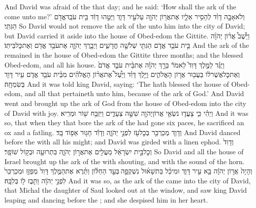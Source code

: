 {And David was afraid of the \lord\space that day; and he said: ‘How shall the ark of the \lord\space come unto me?’}
{וְלֹא\maqqaf אָבָ֣ה דָוִ֗ד לְהָסִ֥יר אֵלָ֛יו אֶת\maqqaf אֲר֥וֹן יְהֹוָ֖ה עַל\maqqaf עִ֣יר דָּוִ֑ד וַיַּטֵּ֣הוּ דָוִ֔ד בֵּ֥ית עֹבֵֽד\maqqaf אֱדֹ֖ם הַגִּתִּֽי׃}
{So David would not remove the ark of the \lord\space unto him into the city of David; but David carried it aside into the house of Obed-edom the Gittite.}
{וַיֵּ֩שֶׁב֩ אֲר֨וֹן יְהֹוָ֜ה בֵּ֣ית עֹבֵ֥ד אֱדֹ֛ם הַגִּתִּ֖י שְׁלֹשָׁ֣ה חֳדָשִׁ֑ים וַיְבָ֧רֶךְ יְהֹוָ֛ה אֶת\maqqaf עֹבֵ֥ד אֱדֹ֖ם וְאֶת\maqqaf כׇּל\maqqaf בֵּיתֽוֹ׃}
{And the ark of the \lord\space remained in the house of Obed-edom the Gittite three months; and the \lord\space blessed Obed-edom, and all his house.}
{וַיֻּגַּ֗ד לַמֶּ֣לֶךְ דָּוִד֮ לֵאמֹר֒ בֵּרַ֣ךְ יְהֹוָ֗ה אֶת\maqqaf בֵּ֨ית עֹבֵ֤ד אֱדֹם֙ וְאֶת\maqqaf כׇּל\maqqaf אֲשֶׁר\maqqaf ל֔וֹ בַּעֲב֖וּר אֲר֣וֹן הָאֱלֹהִ֑ים וַיֵּ֣לֶךְ דָּוִ֗ד וַיַּ֩עַל֩ אֶת\maqqaf אֲר֨וֹן הָאֱלֹהִ֜ים מִבֵּ֨ית עֹבֵ֥ד אֱדֹ֛ם עִ֥יר דָּוִ֖ד בְּשִׂמְחָֽה׃}
{And it was told king David, saying: ‘The \lord\space hath blessed the house of Obed-edom, and all that pertaineth unto him, because of the ark of God.’ And David went and brought up the ark of God from the house of Obed-edom into the city of David with joy.}
{וַיְהִ֗י כִּ֧י צָעֲד֛וּ נֹשְׂאֵ֥י אֲרוֹן\maqqaf יְהֹוָ֖ה שִׁשָּׁ֣ה צְעָדִ֑ים וַיִּזְבַּ֥ח שׁ֖וֹר וּמְרִֽיא׃}
{And it was so, that when they that bore the ark of the \lord\space had gone six paces, he sacrificed an ox and a fatling.}
{וְדָוִ֛ד מְכַרְכֵּ֥ר בְּכׇל\maqqaf עֹ֖ז לִפְנֵ֣י יְהֹוָ֑ה וְדָוִ֕ד חָג֖וּר אֵפ֥וֹד בָּֽד׃}
{And David danced before the \lord\space with all his might; and David was girded with a linen ephod.}
{וְדָוִד֙ וְכׇל\maqqaf בֵּ֣ית יִשְׂרָאֵ֔ל מַעֲלִ֖ים אֶת\maqqaf אֲר֣וֹן יְהֹוָ֑ה בִּתְרוּעָ֖ה וּבְק֥וֹל שׁוֹפָֽר׃}
{So David and all the house of Israel brought up the ark of the \lord\space with shouting, and with the sound of the horn.}
{וְהָיָה֙ אֲר֣וֹן יְהֹוָ֔ה בָּ֖א עִ֣יר דָּוִ֑ד וּמִיכַ֨ל בַּת\maqqaf שָׁא֜וּל נִשְׁקְפָ֣ה \legarmeh  בְּעַ֣ד הַחַלּ֗וֹן וַתֵּ֨רֶא אֶת\maqqaf הַמֶּ֤לֶךְ דָּוִד֙ מְפַזֵּ֤ז וּמְכַרְכֵּר֙ לִפְנֵ֣י יְהֹוָ֔ה וַתִּ֥בֶז ל֖וֹ בְּלִבָּֽהּ׃}
{And it was so, as the ark of the \lord\space came into the city of David, that Michal the daughter of Saul looked out at the window, and saw king David leaping and dancing before the \lord; and she despised him in her heart.}
